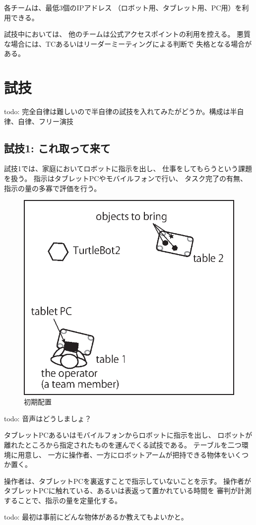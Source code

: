 \documentclass[a4j]{jarticle}
\begin{document}
各チームは、最低3個のIPアドレス
（ロボット用、タブレット用、PC用）を利用できる。

試技中においては、
他のチームは公式アクセスポイントの利用を控える。
悪質な場合には、TCあるいはリーダーミーティングによる判断で
失格となる場合がある。

\section{試技}

todo: 完全自律は難しいので半自律の試技を入れてみたがどうか。構成は半自律、自律、フリー演技

\subsection{試技1: これ取って来て}

試技1では、家庭においてロボットに指示を出し、
仕事をしてもらうという課題を扱う。
指示はタブレットPCやモバイルフォンで行い、
タスク完了の有無、指示の量の多寡で評価を行う。

\begin{figure}[h]
	\begin{center}
		\includegraphics[width=0.4\linewidth]{./IMAGE/test1.eps}
		\caption{初期配置}
		\label{fig:test1}
	\end{center}
\end{figure}

todo: 音声はどうしましょ？

タブレットPCあるいはモバイルフォンからロボットに指示を出し、
ロボットが離れたところから指定されたものを運んでくる試技である。
テーブルを二つ環境に用意し、
一方に操作者、一方にロボットアームが把持できる物体をいくつか置く。


操作者は、タブレットPCを裏返すことで指示していないことを示す。
操作者がタブレットPCに触れている、あるいは表返って置かれている時間を
審判が計測することで、指示の量を定量化する。

todo: 最初は事前にどんな物体があるか教えてもよいかと。
\end{document}
